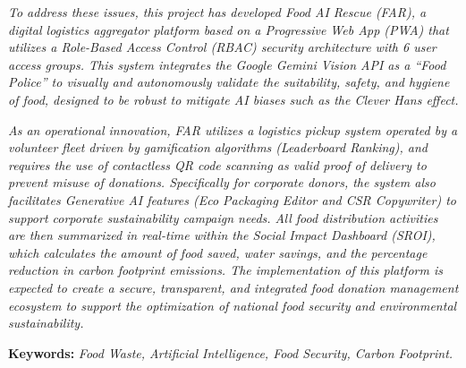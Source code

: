 \textit{To address these issues, this project has developed Food AI Rescue (FAR), a digital logistics aggregator platform based on a Progressive Web App (PWA) that utilizes a Role-Based Access Control (RBAC) security architecture with 6 user access groups. This system integrates the Google Gemini Vision API as a ``Food Police'' to visually and autonomously validate the suitability, safety, and hygiene of food, designed to be robust to mitigate AI biases such as the Clever Hans effect.}

\textit{As an operational innovation, FAR utilizes a logistics pickup system operated by a volunteer fleet driven by gamification algorithms (Leaderboard Ranking), and requires the use of contactless QR code scanning as valid proof of delivery to prevent misuse of donations. Specifically for corporate donors, the system also facilitates Generative AI features (Eco Packaging Editor and CSR Copywriter) to support corporate sustainability campaign needs. All food distribution activities are then summarized in real-time within the Social Impact Dashboard (SROI), which calculates the amount of food saved, water savings, and the percentage reduction in carbon footprint emissions. The implementation of this platform is expected to create a secure, transparent, and integrated food donation management ecosystem to support the optimization of national food security and environmental sustainability.}

\noindent \textbf{Keywords:} \textit{Food Waste, Artificial Intelligence, Food Security, Carbon Footprint.}

\newpage
{}
\tableofcontents
\newpage
{}
\listoffigures
\newpage
{}
\listoftables
\newpage